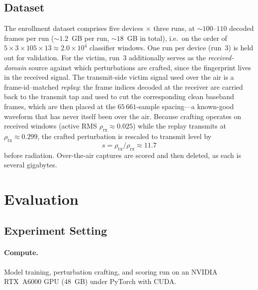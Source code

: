 \documentclass[11pt]{article}
\begin{document}
\subsection{Dataset}
The enrollment dataset comprises five devices $\times$ three runs, at $\sim\!100$--$110$ decoded
frames per run ($\sim\!1.2$~GB per run, $\sim\!18$~GB in total), i.e.\ on the order of
$5\times 3\times 105\times 13\approx 2.0\times10^{4}$ classifier windows. One run per device
(run~3) is held out for validation. For the victim, run~3 additionally serves as the
\emph{received-domain} source against which perturbations are crafted, since the fingerprint lives
in the received signal. The transmit-side victim signal used over the air is a frame-id--matched
\emph{replay}: the frame indices decoded at the receiver are carried back to the transmit tap and
used to cut the corresponding clean baseband frames, which are then placed at the $65\,661$-sample
spacing---a known-good waveform that has never itself been over the air. Because crafting operates
on received windows (active RMS $\rho_{\mathrm{rx}}\!\approx\!0.025$) while the replay transmits at
$\rho_{\mathrm{tx}}\!\approx\!0.299$, the crafted perturbation is rescaled to transmit level by
\begin{equation}\label{eq:scale}
  s=\rho_{\mathrm{tx}}/\rho_{\mathrm{rx}}\approx 11.7
\end{equation}
before radiation. Over-the-air captures are scored and then deleted, as each is several gigabytes.

\section{Evaluation}

\subsection{Experiment Setting}
\paragraph{Compute.} Model training, perturbation crafting, and scoring run on an NVIDIA RTX~A6000
GPU ($48$~GB) under PyTorch with CUDA.
\end{document}
